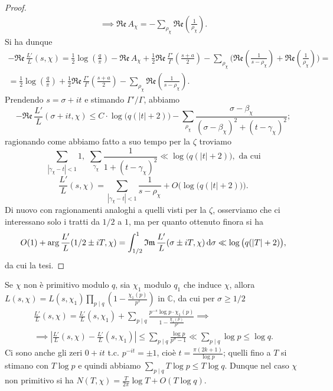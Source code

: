 \begin{proof}
\begin{gather*}
    \implies \mathfrak{Re}\,A_\chi=-\sum_{\rho_\chi} \mathfrak{Re}\left(\frac{1}{\rho_\chi}\right).
  \end{gather*}
  Si ha dunque
  \begin{gather*}
    -\mathfrak{Re}\,\frac{L'}{L}(s,\chi)=\frac{1}{2}\log\left(\frac{q}{\pi}\right)-\mathfrak{Re}\,A_\chi+\frac{1}{2}\mathfrak{Re}\,\frac{\Gamma'}{\Gamma}\left(\frac{s+a}{2}\right)-\sum_{\rho_\chi}\Bigg(\mathfrak{Re}\left(\frac{1}{s-\rho_\chi}\right)+\mathfrak{Re}\left(\frac{1}{\rho_\chi}\right)\Bigg)=\\
    =\frac{1}{2}\log\left(\frac{q}{\pi}\right)+\frac{1}{2}\mathfrak{Re}\,\frac{\Gamma'}{\Gamma}\left(\frac{s+a}{2}\right)-\sum_{\rho_\chi}\mathfrak{Re}\left(\frac{1}{s-\rho_\chi}\right).
  \end{gather*}
  Prendendo $s=\sigma+it$ e stimando $\Gamma'/\Gamma$, abbiamo
  $$-\mathfrak{Re}\,\frac{L'}{L}(\sigma+it,\chi) \le C\cdot\log\big(q(|t|+2)\big)-\sum_{\rho_\chi} \frac{\sigma-\beta_\chi}{(\sigma-\beta_\chi)^2+(t-\gamma_\chi)^2};$$
  ragionando come abbiamo fatto a suo tempo per la $\zeta$ troviamo
  $$\sum_{|\gamma_\chi-t|<1} 1, \,\, \sum_{\gamma_\chi}\frac{1}{1+(t-\gamma_\chi)^2} \ll \log\big(q(|t|+2)\big), \text{ da cui}$$
  $$\frac{L'}{L}(s,\chi)=\sum_{|\gamma_\chi-t|<1} \frac{1}{s-\rho_\chi}+O\Big(\log\big(q(|t|+2)\big)\Big).$$
  Di nuovo con ragionamenti analoghi a quelli visti per la $\zeta$, osserviamo che ci interessano solo i tratti da $1/2$ a $1$, ma per quanto ottenuto finora si ha
  $$O(1)+\arg\frac{L'}{L}(1/2 \pm iT,\chi)=\int_{1/2}^1 \mathfrak{Im}\,\frac{L'}{L}(\sigma \pm iT,\chi)\mathop{}\!\mathrm{d}\sigma \ll \log\big(q(|T|+2)\big),$$
  da cui la tesi.
\end{proof}

\begin{oss}
  Se $\chi$ non è primitivo modulo $q$, sia $\chi_1$ modulo $q_1$ che induce $\chi$, allora $\displaystyle L(s,\chi)=L(s,\chi_1)\prod_{p \mid q}\left(1-\frac{\chi_1(p)}{p^s}\right)$ in $\mathbb{C}$, da cui per $\sigma \ge 1/2$
  \begin{gather*}
    \frac{L'}{L}(s,\chi)=\frac{L'}{L}(s,\chi_1)+\sum_{p \mid q} \frac{p^{-s}\log{p}\cdot\chi_1(p)}{1-\frac{\chi_1(p)}{p^s}} \implies \\
    \implies \left|\frac{L'}{L}(s,\chi)-\frac{L'}{L}(s,\chi_1)\right| \le \sum_{p \mid q} \frac{\log{p}}{p^{\sigma}-1} \ll \sum_{p \mid q} \log{p} \le \log{q}.
  \end{gather*}
  Ci sono anche gli zeri $0+it$ t.c. $p^{-it}=\pm 1$, cioè $t=\frac{\pi(2k+1)}{\log{p}}$; quelli fino a $T$ si stimano con $T\log{p}$ e quindi abbiamo $\displaystyle \sum_{p \mid q} T\log{p} \le T\log{q}$. Dunque nel caso $\chi$ non primitivo si ha $N(T,\chi)=\frac{T}{2\pi}\log{T}+O(T\log{q})$.
\end{oss}
